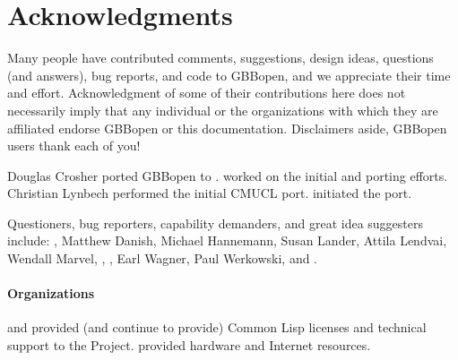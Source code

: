 


\section*{Acknowledgments}
\T{}%
\label{sec:acknowledgments}%
%

Many people have contributed comments, suggestions, design ideas, questions
(and answers), bug reports, and code to GBBopen, and we appreciate their time
and effort.  Acknowledgment of some of their contributions here does not
necessarily imply that any individual or the organizations with which they are
affiliated endorse GBBopen or this documentation.  Disclaimers aside, GBBopen
users thank each of you!

Douglas Crosher ported GBBopen to .   worked on the initial  and
 porting efforts.
Christian Lynbech performed the initial CMUCL port.   initiated the
 port.

Questioners, bug reporters, capability demanders, and great idea suggesters
include: , Matthew Danish,
Michael Hannemann, Susan Lander, Attila Lendvai, Wendall Marvel,
, , Earl Wagner, Paul Werkowski, and
.

\paragraph{Organizations}

 and  provided (and continue to provide)
Common Lisp licenses and technical support to the Project.
 provided hardware
and Internet resources.  

